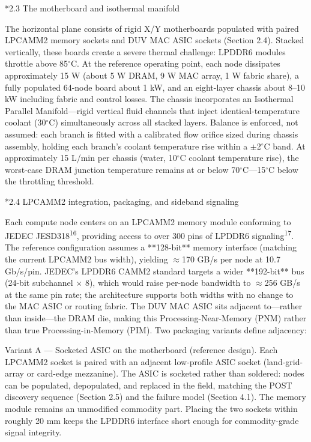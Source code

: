\documentclass[12pt]{article}
\makeatletter
\renewcommand\subsection{\@startsection{subsection}{2}{\z@}{-1.0ex \@plus -0.2ex}{0.3ex}{\normalsize\bfseries}}
\makeatother
\begin{document}
\subsection*{2.3 The motherboard and isothermal manifold}

The horizontal plane consists of rigid X/Y motherboards populated with paired LPCAMM2 memory sockets and DUV MAC ASIC sockets (Section 2.4). Stacked vertically, these boards create a severe thermal challenge: LPDDR6 modules throttle above 85$^\circ$C. At the reference operating point, each node dissipates approximately 15 W (about 5 W DRAM, 9 W MAC array, 1 W fabric share), a fully populated 64-node board about 1 kW, and an eight-layer chassis about 8--10 kW including fabric and control losses. The chassis incorporates an Isothermal Parallel Manifold---rigid vertical fluid channels that inject identical-temperature coolant (30$^\circ$C) simultaneously across all stacked layers. Balance is enforced, not assumed: each branch is fitted with a calibrated flow orifice sized during chassis assembly, holding each branch's coolant temperature rise within a $\pm$2$^\circ$C band. At approximately 15 L/min per chassis (water, 10$^\circ$C coolant temperature rise), the worst-case DRAM junction temperature remains at or below 70$^\circ$C---15$^\circ$C below the throttling threshold.

\subsection*{2.4 LPCAMM2 integration, packaging, and sideband signaling}

Each compute node centers on an LPCAMM2 memory module conforming to JEDEC JESD318\textsuperscript{16}, providing access to over 300 pins of LPDDR6 signaling\textsuperscript{17}. The reference configuration assumes a **128-bit** memory interface (matching the current LPCAMM2 bus width), yielding $\approx$170 GB/s per node at 10.7 Gb/s/pin. JEDEC's LPDDR6 CAMM2 standard targets a wider **192-bit** bus (24-bit subchannel $\times$ 8), which would raise per-node bandwidth to $\approx$256 GB/s at the same pin rate; the architecture supports both widths with no change to the MAC ASIC or routing fabric. The DUV MAC ASIC sits adjacent to---rather than inside---the DRAM die, making this Processing-Near-Memory (PNM) rather than true Processing-in-Memory (PIM). Two packaging variants define adjacency:

Variant A --- Socketed ASIC on the motherboard (reference design). Each LPCAMM2 socket is paired with an adjacent low-profile ASIC socket (land-grid-array or card-edge mezzanine). The ASIC is socketed rather than soldered: nodes can be populated, depopulated, and replaced in the field, matching the POST discovery sequence (Section 2.5) and the failure model (Section 4.1). The memory module remains an unmodified commodity part. Placing the two sockets within roughly 20 mm keeps the LPDDR6 interface short enough for commodity-grade signal integrity.
\end{document}
